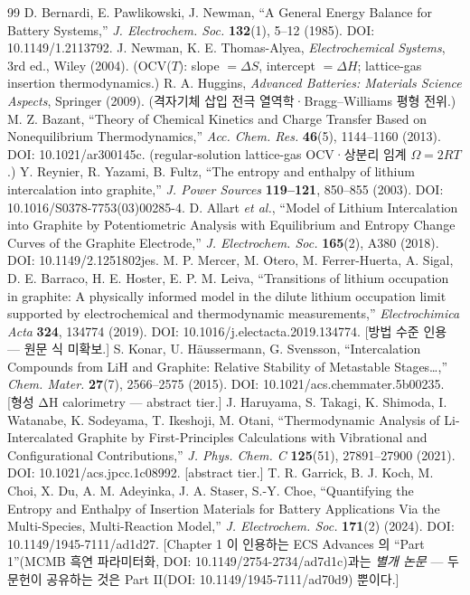 \documentclass[11pt,a4paper]{article}
\begin{document}
\begin{thebibliography}{99}
 D. Bernardi, E. Pawlikowski, J. Newman, ``A General Energy Balance for Battery Systems,'' \emph{J. Electrochem. Soc.} \textbf{132}(1), 5--12 (1985). DOI: 10.1149/1.2113792.
 J. Newman, K. E. Thomas-Alyea, \emph{Electrochemical Systems}, 3rd ed., Wiley (2004). (OCV($T$): slope $=\Delta S$, intercept $=\Delta H$; lattice-gas insertion thermodynamics.)
 R. A. Huggins, \emph{Advanced Batteries: Materials Science Aspects}, Springer (2009). (격자기체 삽입 전극 열역학·Bragg--Williams 평형 전위.)
 M. Z. Bazant, ``Theory of Chemical Kinetics and Charge Transfer Based on Nonequilibrium Thermodynamics,'' \emph{Acc. Chem. Res.} \textbf{46}(5), 1144--1160 (2013). DOI: 10.1021/ar300145c. (regular-solution lattice-gas OCV·상분리 임계 $\Omega=2RT$.)
 Y. Reynier, R. Yazami, B. Fultz, ``The entropy and enthalpy of lithium intercalation into graphite,'' \emph{J. Power Sources} \textbf{119--121}, 850--855 (2003). DOI: 10.1016/S0378-7753(03)00285-4.
 D. Allart \emph{et al.}, ``Model of Lithium Intercalation into Graphite by Potentiometric Analysis with Equilibrium and Entropy Change Curves of the Graphite Electrode,'' \emph{J. Electrochem. Soc.} \textbf{165}(2), A380 (2018). DOI: 10.1149/2.1251802jes.
 M. P. Mercer, M. Otero, M. Ferrer-Huerta, A. Sigal, D. E. Barraco, H. E. Hoster, E. P. M. Leiva, ``Transitions of lithium occupation in graphite: A physically informed model in the dilute lithium occupation limit supported by electrochemical and thermodynamic measurements,'' \emph{Electrochimica Acta} \textbf{324}, 134774 (2019). DOI: 10.1016/j.electacta.2019.134774. [방법 수준 인용 — 원문 식 미확보.]
 S. Konar, U. Häussermann, G. Svensson, ``Intercalation Compounds from LiH and Graphite: Relative Stability of Metastable Stages\ldots,'' \emph{Chem. Mater.} \textbf{27}(7), 2566--2575 (2015). DOI: 10.1021/acs.chemmater.5b00235. [형성 ΔH calorimetry — abstract tier.]
 J. Haruyama, S. Takagi, K. Shimoda, I. Watanabe, K. Sodeyama, T. Ikeshoji, M. Otani, ``Thermodynamic Analysis of Li-Intercalated Graphite by First-Principles Calculations with Vibrational and Configurational Contributions,'' \emph{J. Phys. Chem. C} \textbf{125}(51), 27891--27900 (2021). DOI: 10.1021/acs.jpcc.1c08992. [abstract tier.]
 T. R. Garrick, B. J. Koch, M. Choi, X. Du, A. M. Adeyinka, J. A. Staser, S.-Y. Choe, ``Quantifying the Entropy and Enthalpy of Insertion Materials for Battery Applications Via the Multi-Species, Multi-Reaction Model,'' \emph{J. Electrochem. Soc.} \textbf{171}(2) (2024). DOI: 10.1149/1945-7111/ad1d27. [Chapter 1 이 인용하는 ECS Advances 의 ``Part 1''(MCMB 흑연 파라미터화, DOI: 10.1149/2754-2734/ad7d1c)과는 \emph{별개 논문} — 두 문헌이 공유하는 것은 Part II(DOI: 10.1149/1945-7111/ad70d9) 뿐이다.]

\end{thebibliography}
\end{document}
